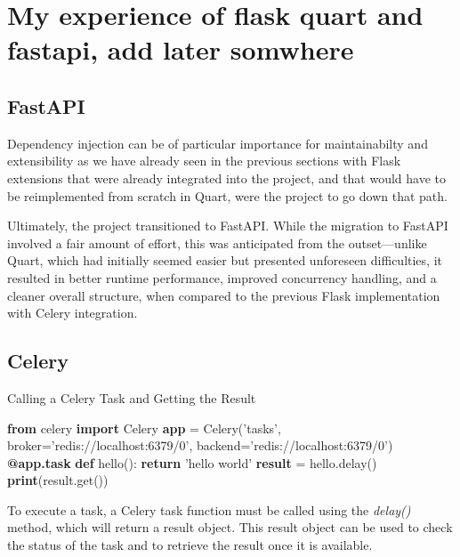 \section{My experience of flask quart and fastapi, add later somwhere}
  


  \subsection{FastAPI}
    Dependency injection can be of particular importance for maintainabilty and extensibility as we have already seen in the previous 
    sections with Flask extensions that were already integrated into the project, and that would have to be reimplemented from scratch 
    in Quart, were the project to go down that path. 
    
    Ultimately, the project transitioned to FastAPI. While the migration to FastAPI involved a fair amount of effort, this 
    was anticipated from the outset—unlike Quart, which had initially seemed easier but presented unforeseen difficulties, 
    it resulted in better runtime performance, improved concurrency handling, and a cleaner overall structure, when compared 
    to the previous Flask implementation with Celery integration.


\subsection{Celery}

  \begin{algorithm}
    \caption{Calling a Celery Task and Getting the Result}\label{celery-call-result}
    \begin{algorithmic}[1]
      \State \textbf{from} celery \textbf{import} Celery
      \State
      \State \textbf{app} = Celery('tasks', broker='redis://localhost:6379/0', backend='redis://localhost:6379/0')
      \State
      \State \textbf{@app.task}
      \State \textbf{def} hello():
      \State \hspace{1em} \textbf{return} 'hello world'
      \State
      \State \textbf{result} = hello.delay()
      \State \textbf{print}(result.get())
    \end{algorithmic}
  \end{algorithm}

  To execute a task, a Celery task function must be called using the \textit{delay()} method, which will return a result object. 
  This result object can be used to check the status of the task and to retrieve the result once it is available.

